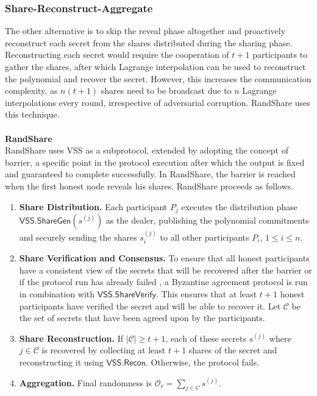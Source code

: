 \documentclass[letterpaper,twocolumn,10pt]{article}
\theoremstyle{definition}
\theoremstyle{remark}
\begin{document}
\subsubsection{Share-Reconstruct-Aggregate}
The other alternative is to skip the reveal phase altogether and proactively reconstruct each secret from the shares distributed during the sharing phase. Reconstructing each secret would require the cooperation of $t+1$ participants to gather the shares, after which Lagrange interpolation can be used to reconstruct the polynomial and recover the secret. However, this increases the communication complexity, as $n (t + 1)$ shares need to be broadcast due to $n$ Lagrange interpolations every round, irrespective of adversarial corruption. RandShare \cite{syta2017scalable} uses this technique.\\\\
\textbf{RandShare}\\
RandShare uses VSS as a subprotocol, extended by adopting the concept of barrier, a specific point in the protocol execution after which the output is fixed and guaranteed to complete successfully. In RandShare, the barrier is reached when the first honest node reveals his shares.
RandShare proceeds as follows.

\begin{enumerate}
    \item \textbf{Share Distribution.} Each participant $P_j$ executes the distribution phase $\mathsf{VSS.ShareGen}(s^{(j)})$ as the dealer, publishing the polynomial commitments and securely sending the shares $s_i^{(j)}$ to all other participants $P_i$, $1\le i\le n$.
    \item \textbf{Share Verification and Consensus.} To ensure that all honest participants have a consistent view of the secrets that will be recovered after the barrier or if the protocol run has already failed , a Byzantine agreement protocol is run in combination with $\mathsf{VSS.ShareVerify}$. This ensures that at least $t+1$ honest participants have verified the secret and will be able to recover it. Let $\mathcal{C}$ be the set of secrets that have been agreed upon by the participants.
    \item \textbf{Share Reconstruction.} If $\lvert \mathcal{C} \rvert \ge t+1$, each of these secrets $s^{(j)}$ where $j \in \mathcal{C}$ is recovered by collecting at least $t+1$ shares of the secret and reconstructing it using $\mathsf{VSS.Recon}$. Otherwise, the protocol fails.
    \item \textbf{Aggregation.} Final randomness is $\mathcal{O}_r = \sum_{j \in C}s^{(j)}$.
    
\end{enumerate}
\end{document}
